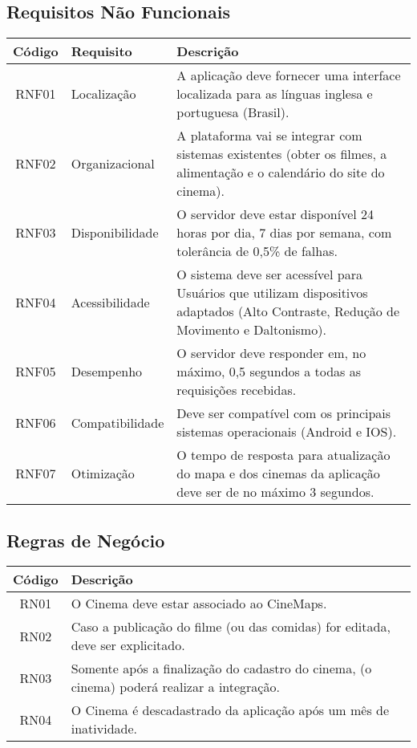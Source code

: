 \documentclass[
	article,			%
	12pt,				%
	oneside,			%
	a4paper,			%
	english,			%
	brazil,				%
	sumario=tradicional
	]{abntex2}
\begin{document}
\subsection{Requisitos Não Funcionais}

\begin{tabular}{|c|l|p{8cm}|}
\hline
\textbf{Código} & \textbf{Requisito} & \textbf{Descrição} \\
\hline
RNF01 & Localização & A aplicação deve fornecer uma interface localizada para as línguas inglesa e portuguesa (Brasil). \\
\hline
RNF02 & Organizacional & A plataforma vai se integrar com sistemas existentes (obter os filmes, a alimentação e o calendário do site do cinema). \\
\hline
RNF03 & Disponibilidade & O servidor deve estar disponível 24 horas por dia, 7 dias por semana, com tolerância de 0,5\% de falhas. \\
\hline
RNF04 & Acessibilidade & O sistema deve ser acessível para Usuários que utilizam dispositivos adaptados (Alto Contraste, Redução de Movimento e Daltonismo). \\
\hline
RNF05 & Desempenho & O servidor deve responder em, no máximo, 0,5 segundos a todas as requisições recebidas. \\
\hline
RNF06 & Compatibilidade & Deve ser compatível com os principais sistemas operacionais (Android e IOS). \\
\hline
RNF07 & Otimização & O tempo de resposta para atualização do mapa e dos cinemas da aplicação deve ser de no máximo 3 segundos. \\
\hline

\end{tabular}

\subsection{Regras de Negócio}

\begin{tabular}{|c|p{11.275cm}|}
\hline
\textbf{Código} & \textbf{Descrição} \\
\hline
RN01 & O Cinema deve estar associado ao CineMaps. \\
\hline
RN02 & Caso a publicação do filme (ou das comidas) for editada, deve ser explicitado. \\
\hline
RN03 & Somente após a finalização do cadastro do cinema, (o cinema) poderá realizar a integração. \\
\hline
RN04 & O Cinema é descadastrado da aplicação após um mês de inatividade. \\
\hline
\end{tabular}
\end{document}
